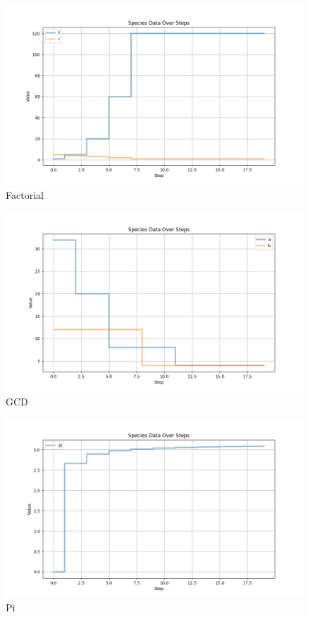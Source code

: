\begin{figure}[H]
    \centering
    \includegraphics[width=\textwidth]{report/figures/InterpreterPlots/factorialInt.png}
    \caption{Factorial}
\end{figure}

\begin{figure}[H]
    \centering
    \includegraphics[width=\textwidth]{report/figures/InterpreterPlots/gcdInt.png}
    \caption{GCD}
\end{figure}

\begin{figure}[H]
    \centering
    \includegraphics[width=\textwidth]{report/figures/InterpreterPlots/piInt.png}
    \caption{Pi}
\end{figure}

